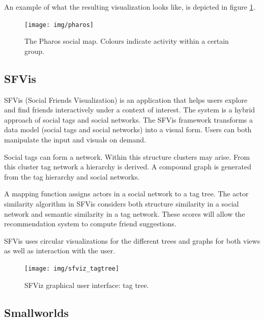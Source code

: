 An example of what the resulting visualization looks like, is depicted in figure \ref{figure:pharos}.

\begin{figure}%
	\begin{center}
		\texttt{[image: img/pharos]}%
	\end{center}
	\caption{The Pharos social map. Colours indicate activity within a certain group.}%
	\label{figure:pharos}%
\end{figure}




\subsection{SFVis}\label{chapter:survey:section:applications:subsection:sfvis}

SFVis (Social Friends Visualization) is an application that helps users explore and find friends interactively under a context of interest. The system is a hybrid approach of social tags and social networks. The SFVis framework transforms a data model (social tags and social networks) into a visual form. Users can both manipulate the input and visuals on demand.

Social tags can form a network. Within this structure clusters may arise. From this cluster tag network a hierarchy is derived. A compound graph is generated from the tag hierarchy and social networks.

A mapping function assigns actors in a social network to a tag tree. The actor similarity algorithm in SFVis considers both structure similarity in a social network and semantic similarity in a tag network. These scores will allow the recommendation system to compute friend suggestions.

SFVis uses circular visualizations for the different trees and graphs for both views as well as interaction with the user.

\begin{figure}%
	\begin{center}
		\texttt{[image: img/sfviz\_tagtree]}%
	\end{center}
	\caption{SFViz graphical user interface: tag tree.}%
	\label{figure:sfviz}%
\end{figure}




\subsection{Smallworlds}\label{chapter:survey:section:applications:subsection:smallwords}

